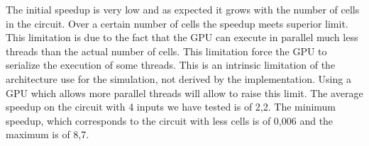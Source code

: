 The initial speedup is very low and as expected it grows with the number of cells in the circuit. Over a certain number of cells the speedup meets superior limit. This limitation is due to the fact that the GPU can execute in parallel much less threads than the actual number of cells. This limitation force the GPU to serialize the execution of some threads. This is an intrinsic limitation of the architecture use for the simulation, not derived by the implementation. Using a GPU which allows more parallel threads will allow to raise this limit. The average speedup on the circuit with 4 inputs we have tested is of 2,2. The minimum speedup, which corresponds to the circuit with less cells is of 0,006 and the maximum is of 8,7.